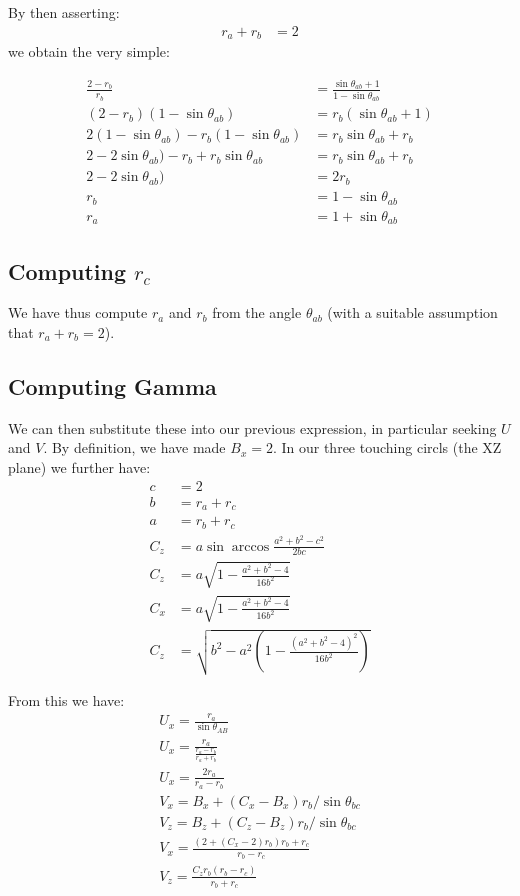 \documentclass{article}
\begin{document}
By then asserting:
\begin{align}
r_a + r_b &= 2
\end{align}
we obtain the very simple:

\begin{align}
  \frac{2-r_b}{r_b} &=  \frac{\sin{\theta_{ab}} + 1}{1 - \sin{\theta_{ab}}} \\
  (2-r_b)(1 - \sin{\theta_{ab}}) &= r_b(\sin{\theta_{ab}} + 1) \\
  2(1 - \sin{\theta_{ab}}) -r_b(1 - \sin{\theta_{ab}}) &= r_b\sin{\theta_{ab}} + r_b \\
  2 - 2\sin{\theta_{ab}}) -r_b + r_b\sin{\theta_{ab}} &= r_b\sin{\theta_{ab}} + r_b \\
  2 - 2\sin{\theta_{ab}})  &=  2 r_b \\
  r_b &= 1 - \sin{\theta_{ab}} \\
  r_a &= 1 + \sin{\theta_{ab}}
\end{align}

\subsection{Computing $r_c$}

We have thus compute $r_a$ and $r_b$ from the angle $\theta_{ab}$ (with a suitable assumption that $r_a+r_b=2$).


\subsection{Computing Gamma}


We can then substitute these into our previous expression, in particular
seeking $U$ and $V$. By definition, we have made $B_x = 2$.
In our three touching circls (the XZ plane) we further have:
\begin{align}
  c &= 2 \\
  b &= r_a + r_c \\
  a &= r_b + r_c \\
  C_z &= a \sin{\arccos{\frac{a^2 + b^2 - c^2}{2bc}}} \\
  C_z &= a \sqrt{1 - \frac{a^2 + b^2 - 4}{16b^2}} \\
  C_x &= a \sqrt{1 - \frac{a^2 + b^2 - 4}{16b^2}} \\
  C_z &= \sqrt{b^2 - a^2 (1 - \frac{(a^2 + b^2 - 4)^2}{16 b^2})}
\end{align}

From this we have:
\begin{align}
  U_x = \frac{r_a}{\sin{\theta_{AB}}} \\
  U_x = \frac{r_a}{\frac{r_a - r_b}{r_a + r_b}} \\
  U_x = \frac{2 r_a}{r_a - r_b} \\
  V_x = B_x + (C_x - B_x) r_b / \sin{\theta_{bc}} \\
  V_z = B_z + (C_z - B_z) r_b / \sin{\theta_{bc}} \\
  V_x =   \frac{(2 + (C_x - 2) r_b) r_b + r_c}{r_b - r_c} \\
  V_z =  \frac{C_z r_b (r_b - r_c)}{r_b + r_c} \\
\end{align}
\end{document}
